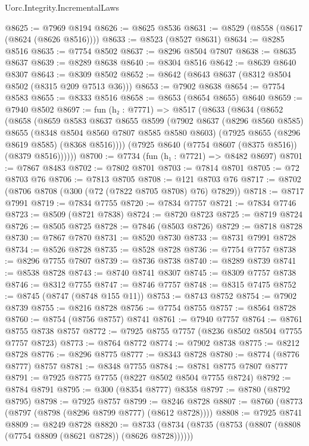 \begin{lexlean}{Uorc.Integrity.IncrementalLaws}
\begin{coremodule}
@8625 := @7969 @8194
@8626 := @8625 @8536
@8631 := @8529 (@8558 (@8617 (@8624 (@8626 @8516))))
@8633 := @8523 (@8527 @8631)
@8634 := @8285 @8516
@8635 := @7754 @8502
@8637 := @8296 @8504 @7807
@8638 := @8635 @8637
@8639 := @8289 @8638
@8640 := @8304 @8516
@8642 := @8639 @8640 @8307
@8643 := @8309 @8502
@8652 := @8642 (@8643 @8637 (@8312 @8504 @8502 (@8315 @209 @7513 @36)))
@8653 := @7902 @8638
@8654 := @7754 @8583
@8655 := @8333 @8516
@8658 := @8653 (@8654 @8655) @8640
@8659 := @7940 @8502
@8697 := fun (h₂ : @7771) =>
  @8517
    (@8633
      (@8634
        (@8652
          (@8658
            (@8659
              @8583
              @8637
              @8655
              @8599
              (@7902
                @8637
                (@8296 @8560 @8585)
                @8655
                (@8348 @8504 @8560 @7807 @8585 @8580 @8603)
                (@7925 @8655 (@8296 @8619 @8585) (@8368 @8516))))
            (@7925 @8640 (@7754 @8607 (@8375 @8516)) (@8379 @8516))))))
@8700 := @7734 (fun (h₁ : @7721) => @8482 @8697)
@8701 := @7867 @8483
@8702 := @7802 @8701
@8703 := @7814 @8701
@8705 := @72 @8703 @76
@8706 := @7813 @8705
@8708 := @121 @8703 @76
@8717 := @8702 (@8706 @8708 (@300 (@72 (@7822 @8705 @8708) @76) @7829))
@8718 := @8717 @7991
@8719 := @7834 @7755
@8720 := @7834 @7757
@8721 := @7834 @7746
@8723 := @8509 (@8721 @7838)
@8724 := @8720 @8723
@8725 := @8719 @8724
@8726 := @8505 @8725
@8728 := @7846 (@8503 @8726)
@8729 := @8718 @8728
@8730 := @7867 @7870
@8731 := @8520 @8730
@8733 := @8731 @7991 @8728
@8734 := @8526 @8728
@8735 := @8528 @8728
@8736 := @7754 @7757
@8738 := @8296 @7755 @7807
@8739 := @8736 @8738
@8740 := @8289 @8739
@8741 := @8538 @8728
@8743 := @8740 @8741 @8307
@8745 := @8309 @7757 @8738
@8746 := @8312 @7755
@8747 := @8746 @7757
@8748 := @8315 @7475
@8752 := @8745 (@8747 (@8748 @155 @11))
@8753 := @8743 @8752
@8754 := @7902 @8739
@8755 := @8216 @8728
@8756 := @7754 @8755
@8757 := @8564 @8728
@8760 := @8754 (@8756 @8757) @8741
@8761 := @7940 @7757
@8764 := @8761 @8755 @8738 @8757
@8772 := @7925 @8755 @7757 (@8236 @8502 @8504 @7755 @7757 @8723)
@8773 := @8764 @8772
@8774 := @7902 @8738
@8775 := @8212 @8728
@8776 := @8296 @8775
@8777 := @8343 @8728
@8780 := @8774 (@8776 @8777) @8757
@8781 := @8348 @7755
@8784 := @8781 @8775 @7807 @8777
@8791 := @7925 @8775 @7755 (@8227 @8502 @8504 @7755 @8724)
@8792 := @8784 @8791
@8795 := @300 (@8354 @8777) @8358
@8797 := @8780 (@8792 @8795)
@8798 := @7925 @8757
@8799 := @8246 @8728
@8807 := @8760 (@8773 (@8797 (@8798 (@8296 @8799 @8777) (@8612 @8728))))
@8808 := @7925 @8741
@8809 := @8249 @8728
@8820 := @8733 (@8734 (@8735 (@8753 (@8807 (@8808 (@7754 @8809 (@8621 @8728)) (@8626 @8728))))))

\end{coremodule}
\end{lexlean}
